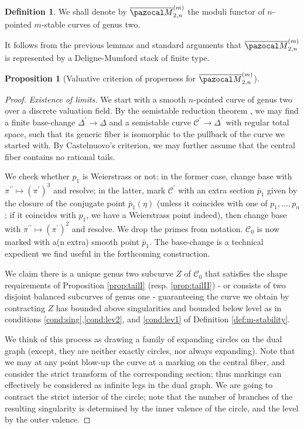 \documentclass[11pt]{amsart}
\renewcommand{\to}{\rightarrow}
\newcommand{\oM}{\overline{\pazocal M}}
\newcommand{\dvr}{\Delta}
\theoremstyle{plain}
\newtheorem{prop}[thm]{Proposition}
\theoremstyle{definition}
\newtheorem{dfn}[thm]{Definition}
\begin{document}
\begin{dfn}
 We shall denote by $\oM^{(m)}_{2,n}$ the moduli functor of $n$-pointed $m$-stable curves of genus two.
\end{dfn}

It follows from the previous lemmas and standard arguments that $\oM^{(m)}_{2,n}$ is represented by a Deligne-Mumford stack of finite type.

\begin{prop}[Valuative criterion of properness for $\oM^{(m)}_{2,n}$]
 
\end{prop}
\begin{proof}
 \emph{Existence of limits.}
  We start with a smooth $n$-pointed curve of genus two over a discrete valuation field. By the semistable reduction theorem \cite[Corollary 2.7]{DM}, we may find a finite base-change $\dvr^\prime\to\dvr$ and a semistable curve $\mathcal C^\prime\to\dvr^\prime$ with regular total space, such that its generic fiber is isomorphic to the pullback of the curve we started with. By Castelnuovo's criterion, we may further assume that the central fiber contains no rational tails.
  
  We check whether $p_1$ is Weierstrass or not: in the former case, change base with $\pi^{\prime\prime}\mapsto(\pi^\prime)^3$ and resolve; in the latter, mark $\mathcal C^\prime$ with an extra section $\bar p_1$ given by the closure of the conjugate point $\bar p_1(\eta)$ (unless it coincides with one of $p_1,\ldots,p_n$; if it coincides with $p_1$, we have a Weierstrass point indeed), then change base with $\pi^{\prime\prime}\mapsto(\pi^\prime)^2$ and resolve. We drop the primes from notation. $\mathcal C_0$ is now marked with a(n extra) smooth point $\bar p_1$. The base-change is a technical expedient we find useful in the forthcoming construction.
  
  We claim there is a unique genus two subcurve $Z$ of $\mathcal C_0$ that satisfies the shape requirements of Proposition \ref{prop:tailI} (resp. \ref{prop:tailII}) - or consists of two disjoint balanced subcurves of genus one - guaranteeing the curve we obtain by contracting $Z$ has bounded above singularities and bounded below level as in conditions \eqref{cond:sing},\eqref{cond:lev2}, and \eqref{cond:lev1} of Definition \ref{def:m-stability}.
  
  We think of this process as drawing a family of expanding circles on the dual graph (except, they are neither exactly circles, nor always expanding). Note that we may at any point blow-up the curve at a marking on the central fiber, and consider the strict transform of the corresponding section; thus markings can effectively be considered as infinite legs in the dual graph. We are going to contract the strict interior of the circle; note that the number of branches of the resulting singularity is determined by the inner valence of the circle, and the level by the outer valence.
  

\end{proof}
\end{document}
